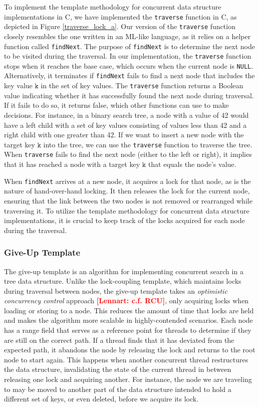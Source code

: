 \documentclass[a4paper,UKenglish,cleveref, autoref, thm-restate]{lipics-v2021}
\newcommand{\lb}[1]{\textbf{\textcolor{red}{[Lennart: #1]}}}
\begin{document}
To implement the template methodology for concurrent data structure implementations in C, we have implemented the \lstinline{traverse} function in C, as depicted in Figure \ref{traverse_lock_a}.  Our version of the \lstinline{traverse} function closely resembles the one written in an ML-like language, as it relies on a helper function called \lstinline{findNext}. The purpose of \lstinline{findNext} is to determine the next node to be visited during the traversal. In our implementation, the \lstinline{traverse} function stops when it reaches the base case, which occurs when the current node is \lstinline{NULL}. Alternatively, it terminates if \lstinline{findNext} fails to find a next node that includes the key value $\texttt{k}$ in the set of key values. The \lstinline{traverse} function returns a Boolean value indicating whether it has successfully found the next node during traversal. If it fails to do so, it returns false, which other functions can use to make decisions. For instance, in a binary search tree, a node with a value of 42 would have a left child with a set of key values consisting of values less than 42 and a right child with one greater than 42. If we want to insert a new node with the target key $\texttt{k}$ into the tree, we can use the \lstinline{traverse} function to traverse the tree. When \lstinline{traverse} fails to find the next node (either to the left or right), it implies that it has reached a node with a target key $\texttt{k}$ that equals the node's value. 

When \lstinline{findNext} arrives at a new node, it acquires a lock for that node, as is the nature of hand-over-hand locking. It then releases the lock for the current node, ensuring that the link between the two nodes is not removed or rearranged while traversing it. To utilize the template methodology for concurrent data structure implementations, it is crucial to keep track of the locks acquired for each node during the traversal. 

\subsubsection{Give-Up Template}
\label{give-up-algo}
The give-up template is an algorithm for implementing concurrent search in a tree data structure. Unlike the lock-coupling template, which maintains locks during traversal between nodes, the give-up template takes an \emph{optimistic concurrency control} approach \lb{c.f. RCU}, only acquiring locks when loading or storing to a node. This reduces the amount of time that locks are held and makes the algorithm more scalable in highly-contended scenarios. Each node has a range field that serves as a reference point for threads to determine if they are still on the correct path. If a thread finds that it has deviated from the expected path, it abandons the node by releasing the lock and returns to the root node to start again. This happens when another concurrent thread restructures the data structure, invalidating the state of the current thread in between releasing one lock and acquiring another. For instance, the node we are traveling to may be moved to another part of the data structure intended to hold a different set of keys, or even deleted, before we acquire its lock.
\end{document}
